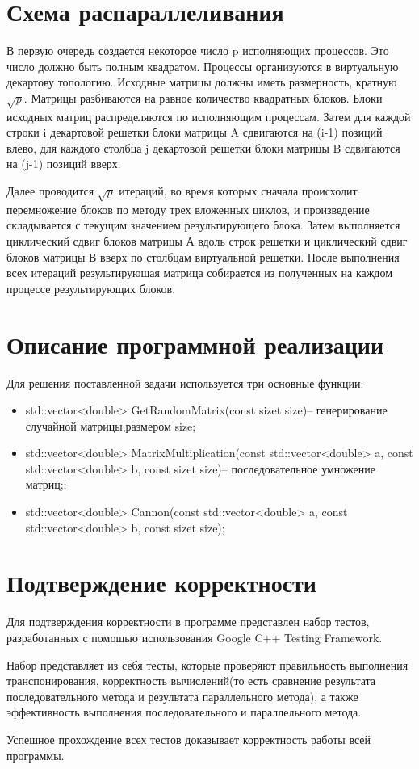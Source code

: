 \documentclass{report}
\begin{document}
\section*{Схема распараллеливания}
В первую очередь создается некоторое число p исполняющих процессов. Это число должно быть полным квадратом. Процессы организуются в виртуальную декартову топологию. Исходные матрицы должны иметь размерность, кратную $\sqrt{p}$.  Матрицы разбиваются на равное количество квадратных блоков. Блоки исходных матриц распределяются по исполняющим процессам. Затем для каждой строки i декартовой решетки блоки матрицы A сдвигаются на (i-1) позиций влево, для каждого столбца j декартовой решетки блоки матрицы B сдвигаются на (j-1) позиций вверх. 
\par Далее проводится $\sqrt{p}$ итераций, во время которых сначала происходит перемножение
блоков по методу трех вложенных циклов, и произведение складывается с текущим значением результирующего блока. Затем выполняется циклический сдвиг блоков матрицы А вдоль строк решетки и циклический сдвиг блоков матрицы В вверх по столбцам виртуальной решетки. После выполнения всех итераций результирующая матрица собирается из полученных на каждом процессе результирующих блоков.
\newpage

\section*{Описание программной реализации}
Для решения поставленной задачи используется три основные функции:
\begin{itemize}
\item std::vector<double> GetRandomMatrix(const sizet size)– генерирование случайной матрицы,размером size;
\item std::vector<double> MatrixMultiplication(const std::vector<double> a, const std::vector<double> b, const sizet size)– последовательное умножение матриц;;
\item std::vector<double> Cannon(const std::vector<double> a, const std::vector<double> b, const sizet size);
\end{itemize}


\newpage

\section*{Подтверждение корректности}
Для подтверждения корректности в программе представлен набор тестов, разработанных с помощью использования Google C++ Testing Framework.
\par Набор представляет из себя тесты, которые проверяют правильность выполнения транспонирования, корректность вычислений(то есть сравнение результата последовательного метода и результата параллельного метода), а также эффективность выполнения последовательного и параллельного метода.
\par Успешное прохождение всех тестов доказывает корректность работы всей программы.
\newpage
\end{document}
